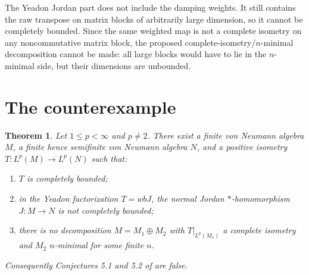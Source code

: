 \documentclass[11pt]{amsart}
\newtheorem{theorem}{Theorem}
\theoremstyle{remark}
\newcommand{\Lp}{L^p}
\begin{document}
The Yeadon Jordan part does not include the damping weights.  It still
contains the raw transpose on matrix blocks of arbitrarily large dimension,
so it cannot be completely bounded.  Since the same weighted map is not a
complete isometry on any noncommutative matrix block, the proposed
complete-isometry/$n$-minimal decomposition cannot be made: all large blocks
would have to lie in the $n$-minimal side, but their dimensions are unbounded.

\section*{The counterexample}

\begin{theorem}
\label{thm:counterexample}
Let $1\leq p<\infty$ and $p\neq2$.  There exist a finite von Neumann algebra
$M$, a finite hence semifinite von Neumann algebra $N$, and a positive
isometry $T:\Lp(M)\to\Lp(N)$ such that:
\begin{enumerate}
\item $T$ is completely bounded;
\item in the Yeadon factorization $T=wbJ$, the normal Jordan
      $*$-homomorphism $J:M\to N$ is not completely bounded;
\item there is no decomposition $M=M_1\oplus M_2$ with
      $T|_{\Lp(M_1)}$ a complete isometry and $M_2$ $n$-minimal for some
      finite $n$.
\end{enumerate}
Consequently Conjectures 5.1 and 5.2 of \cite{Arhancet2020} are false.
\end{theorem}
\end{document}
